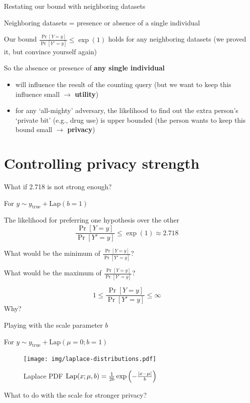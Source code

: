 \documentclass[12pt,aspectratio=169,handout]{beamer}
\begin{document}
\begin{frame}{Restating our bound with neighboring datasets}

Neighboring datasets = presence or absence of a single individual

Our bound $\frac{\Pr[Y = y]}{\Pr[Y' = y]} \leq \exp(1)$ holds for any neighboring datasets (we proved it, but convince yourself again)

So the absence or presence of \textbf{any single individual}
\begin{itemize}
	\item will influence the result of the counting query (but we want to keep this influence small $\rightarrow$ \textbf{utility})
	\item for any `all-mighty' adversary, the likelihood to find out the extra person's `private bit' (e.g., drug use) is upper bounded (the person wants to keep this bound small $\rightarrow$ \textbf{privacy})
\end{itemize}

\end{frame}



\section{Controlling privacy strength}

\begin{frame}{What if 2.718 is not strong enough?}

For $y \sim y_{\mathrm{true}} + \textrm{Lap}(b=1)$

The likelihood for preferring one hypothesis over the other	
$$
\frac{\Pr[Y = y]}{\Pr[Y' = y]} \leq \exp(1) \approx 2.718
$$

What would be the minimum of $\frac{\Pr[Y = y]}{\Pr[Y' = y]}$?

What would be the maximum of $\frac{\Pr[Y = y]}{\Pr[Y' = y]}$?

\pause

$$1 \leq \frac{\Pr[Y = y]}{\Pr[Y' = y]} \leq \infty$$
Why?

	
\end{frame}




\begin{frame}{Playing with the scale parameter $b$}

For $y \sim y_{\mathrm{true}} + \textrm{Lap}(\mu = 0; b=1)$


\begin{figure}
\texttt{[image: img/laplace-distributions.pdf]}
\caption{Laplace PDF $\textrm{Lap}(x; \mu, b) = \frac{1}{2b} \exp \left( - \frac{\abs{x - \mu}}{b}  \right)$
}
\end{figure}

What to do with the scale for stronger privacy?
	
\end{frame}
\end{document}
